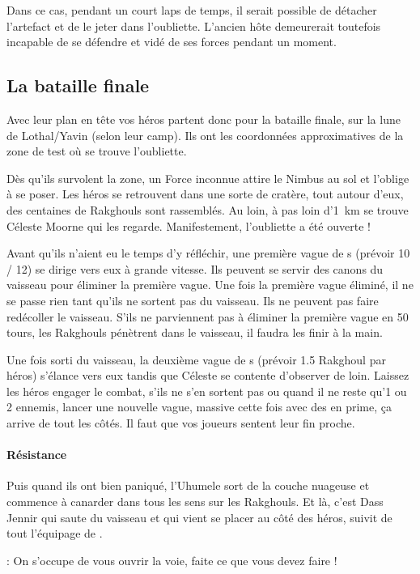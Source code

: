 Dans ce cas, pendant un court laps de temps, il serait possible de détacher l’artefact et de le jeter dans l’oubliette. L’ancien hôte demeurerait toutefois incapable de se défendre et vidé de ses forces pendant un moment.

\subsection{La bataille finale}
Avec leur plan en tête vos héros partent donc pour la bataille finale, sur la lune de Lothal/Yavin (selon leur camp). Ils ont les coordonnées approximatives de la zone de test où se trouve l’oubliette. 

Dès qu’ils survolent la zone, un Force inconnue attire le Nimbus au sol et l’oblige à se poser. Les héros se retrouvent dans une sorte de cratère, tout autour d’eux, des centaines de Rakghouls sont rassemblés. Au loin, à pas loin d’1~km se trouve Céleste Moorne qui les regarde. Manifestement, l’oubliette a été ouverte !

Avant qu’ils n’aient eu le temps d’y réfléchir, une première vague de s (prévoir 10 / 12) se dirige vers eux à grande vitesse. Ils peuvent se servir des canons du vaisseau pour éliminer la première vague. Une fois la première vague éliminé, il ne se passe rien tant qu’ils ne sortent pas du vaisseau. Ils ne peuvent pas faire redécoller le vaisseau. S’ils ne parviennent pas à éliminer la première vague en 50 tours, les Rakghouls pénètrent dans le vaisseau, il faudra les finir à la main.

Une fois sorti du vaisseau, la deuxième vague de s (prévoir 1.5 Rakghoul par héros) s’élance vers eux tandis que Céleste se contente d’observer de loin. Laissez les héros engager le combat, s’ils ne s’en sortent pas ou quand il ne reste qu’1 ou 2 ennemis, lancer une nouvelle vague, massive cette fois avec des  en prime, ça arrive de tout les côtés. Il faut que vos joueurs sentent leur fin proche. 

\paragraph{Résistance}
Puis quand ils ont bien paniqué, l’Uhumele sort de la couche nuageuse et commence à canarder dans tous les sens sur les Rakghouls. Et là, c’est Dass Jennir qui saute du vaisseau et qui vient se placer au côté des héros, suivit de tout l’équipage de . 
\begin{quotebox}
    : On s’occupe de vous ouvrir la voie, faite ce que vous devez faire !
\end{quotebox}

